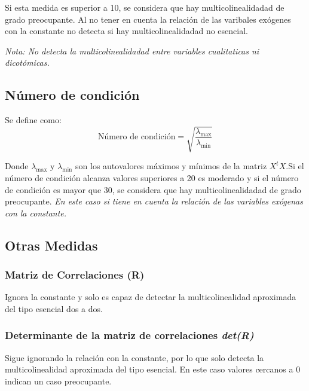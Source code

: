 \documentclass[a4paper,12pt]{article}
\newcommand{\ecuacion}[1]{\ensuremath{#1}}
\begin{document}
Si esta medida es superior a 10, se considera que hay multicolinealidadad de grado preocupante. Al no tener en cuenta la relación de las varibales exógenes con la constante no detecta si hay multicolinealidadad no esencial.

\begin{tcolorbox}[colback=red!5!white,colframe=red!75!black]
    \textit{Nota: No detecta la multicolinealidadad entre variables cualitaticas ni dicotómicas.}
\end{tcolorbox}

\subsection{Número de condición}

Se define como:
\begin{equation}
    \text{Número de condición} = \sqrt{\frac{\lambda_{\text{max}}}{\lambda_{\text{min}}}}
\end{equation}

Donde \ecuacion{\lambda_{\text{max}}} y \ecuacion{\lambda_{\text{min}}} son los autovalores máximos y mínimos de la matriz \ecuacion{X^tX}.Si el número de condición alcanza valores superiores a 20 es moderado y si el número de condición es mayor que 30, se considera que hay multicolinealidadad de grado preocupante. \textit{En este caso si tiene en cuenta la relación de las variables exógenas con la constante.}

\subsection{Otras Medidas}

\subsubsection{Matriz de Correlaciones (R)}

Ignora la constante y solo es capaz de detectar la multicolinealidad aproximada del tipo esencial dos a dos.

\subsubsection{Determinante de la matriz de correlaciones \textit{det(R)}}

Sigue ignorando la relación con la constante, por lo que solo detecta la multicolinealidad aproximada del tipo esencial. En este caso valores cercanos a 0 indican un caso preocupante.
\end{document}

